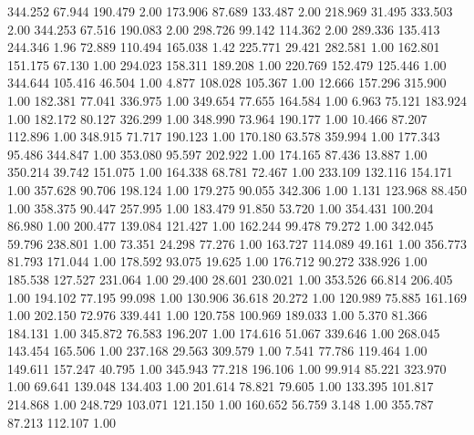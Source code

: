  344.252   67.944  190.479         2.00
 173.906   87.689  133.487         2.00
 218.969   31.495  333.503         2.00
 344.253   67.516  190.083         2.00
 298.726   99.142  114.362         2.00
 289.336  135.413  244.346         1.96
  72.889  110.494  165.038         1.42
 225.771   29.421  282.581         1.00
 162.801  151.175   67.130         1.00
 294.023  158.311  189.208         1.00
 220.769  152.479  125.446         1.00
 344.644  105.416   46.504         1.00
   4.877  108.028  105.367         1.00
  12.666  157.296  315.900         1.00
 182.381   77.041  336.975         1.00
 349.654   77.655  164.584         1.00
   6.963   75.121  183.924         1.00
 182.172   80.127  326.299         1.00
 348.990   73.964  190.177         1.00
  10.466   87.207  112.896         1.00
 348.915   71.717  190.123         1.00
 170.180   63.578  359.994         1.00
 177.343   95.486  344.847         1.00
 353.080   95.597  202.922         1.00
 174.165   87.436   13.887         1.00
 350.214   39.742  151.075         1.00
 164.338   68.781   72.467         1.00
 233.109  132.116  154.171         1.00
 357.628   90.706  198.124         1.00
 179.275   90.055  342.306         1.00
   1.131  123.968   88.450         1.00
 358.375   90.447  257.995         1.00
 183.479   91.850   53.720         1.00
 354.431  100.204   86.980         1.00
 200.477  139.084  121.427         1.00
 162.244   99.478   79.272         1.00
 342.045   59.796  238.801         1.00
  73.351   24.298   77.276         1.00
 163.727  114.089   49.161         1.00
 356.773   81.793  171.044         1.00
 178.592   93.075   19.625         1.00
 176.712   90.272  338.926         1.00
 185.538  127.527  231.064         1.00
  29.400   28.601  230.021         1.00
 353.526   66.814  206.405         1.00
 194.102   77.195   99.098         1.00
 130.906   36.618   20.272         1.00
 120.989   75.885  161.169         1.00
 202.150   72.976  339.441         1.00
 120.758  100.969  189.033         1.00
   5.370   81.366  184.131         1.00
 345.872   76.583  196.207         1.00
 174.616   51.067  339.646         1.00
 268.045  143.454  165.506         1.00
 237.168   29.563  309.579         1.00
   7.541   77.786  119.464         1.00
 149.611  157.247   40.795         1.00
 345.943   77.218  196.106         1.00
  99.914   85.221  323.970         1.00
  69.641  139.048  134.403         1.00
 201.614   78.821   79.605         1.00
 133.395  101.817  214.868         1.00
 248.729  103.071  121.150         1.00
 160.652   56.759    3.148         1.00
 355.787   87.213  112.107         1.00
